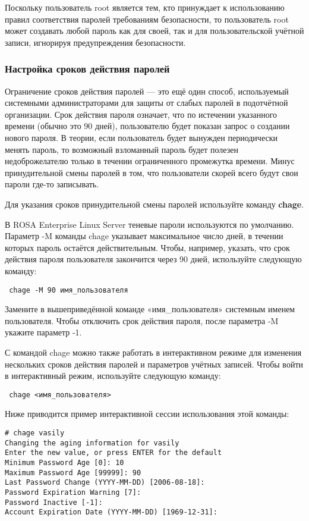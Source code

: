 \documentclass[a4paper,10pt,twoside]{article}
\begin{document}
Поскольку пользователь root является тем, кто принуждает к использованию правил соответствия паролей требованиям безопасности, то пользователь root может создавать любой пароль как для своей, так и для пользовательской учётной записи, игнорируя предупреждения безопасности.


\subsubsection{Настройка сроков действия паролей}
Ограничение сроков действия паролей — это ещё один способ, используемый системными администраторами для защиты от слабых паролей в подотчётной организации. Срок действия пароля означает, что по истечении указанного времени (обычно это 90 дней), пользователю будет показан запрос о создании нового пароля. В теории, если пользователь будет вынужден периодически менять пароль, то возможный взломанный пароль будет полезен недоброжелателю только в течении ограниченного промежутка времени. Минус принудительной смены паролей в том, что пользователи скорей всего будут свои пароли где-то записывать.

Для указания сроков принудительной смены паролей используйте команду \textbf{chage}.

В ROSA Enterprise Linux Server теневые пароли используются по умолчанию. 
Параметр -M команды chage указывает максимальное число дней, в течении которых пароль остаётся действительным. Чтобы, например, указать, что срок действия пароля пользователя закончится через 90 дней, используйте следующую команду:
\begin{verbatim}
 chage -M 90 имя_пользователя
\end{verbatim} 

Замените в вышеприведённой команде «имя\_пользователя» системным именем пользователя. Чтобы отключить срок действия пароля, после параметра -M укажите параметр -1.

С командой chage можно также работать в интерактивном режиме для изменения нескольких сроков действия паролей и параметров учётных записей. Чтобы войти в интерактивный режим, используйте следующую команду:
\begin{verbatim}
 chage <имя_пользователя>
\end{verbatim}

Ниже приводится пример интерактивной сессии использования этой команды:
\begin{verbatim}
# chage vasily
Changing the aging information for vasily
Enter the new value, or press ENTER for the default
Minimum Password Age [0]: 10
Maximum Password Age [99999]: 90
Last Password Change (YYYY-MM-DD) [2006-08-18]:
Password Expiration Warning [7]:
Password Inactive [-1]:
Account Expiration Date (YYYY-MM-DD) [1969-12-31]:
\end{verbatim} 
\end{document}
